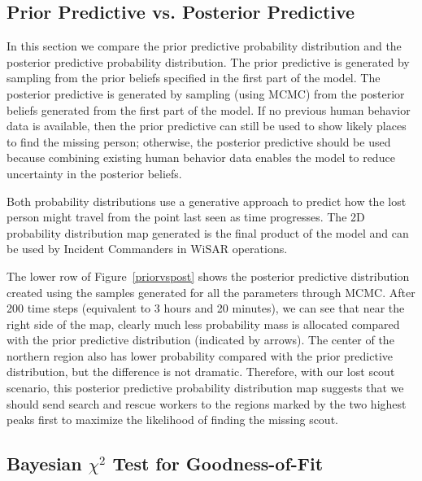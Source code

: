 \documentclass[smallextended,natbib]{svjour3}
\begin{document}
\subsection{Prior Predictive vs. Posterior Predictive}
\label{sec:4.4}

In this section we compare the prior predictive probability distribution and the posterior predictive probability distribution. The prior predictive is generated by sampling from the prior beliefs specified in the first part of the model. The posterior predictive is generated by sampling (using MCMC) from the posterior beliefs generated from the first part of the model. If no previous human behavior data is available, then the prior predictive can still be used to show likely places to find the missing person; otherwise, the posterior predictive should be used because combining existing human behavior data enables the model to reduce uncertainty in the posterior beliefs.

Both probability distributions use a generative approach to predict how the lost person might travel from the point last seen as time progresses. The 2D probability distribution map generated is the final product of the model and can be used by Incident Commanders in WiSAR operations.

The lower row of Figure~\ref{priorvspost} shows the posterior predictive distribution created using the samples generated for all the parameters through MCMC. After 200 time steps (equivalent to 3 hours and 20 minutes), we can see that near the right side of the map, clearly much less probability mass is allocated compared with the prior predictive distribution (indicated by arrows). The center of the northern region also has lower probability compared with the prior predictive distribution, but the difference is not dramatic. Therefore, with our lost scout scenario, this posterior predictive probability distribution map suggests that we should send search and rescue workers to the regions marked by the two highest peaks first to maximize the likelihood of finding the missing scout.

\subsection{Bayesian $\chi^2$ Test for Goodness-of-Fit}
\label{sec:4.5}
\end{document}
